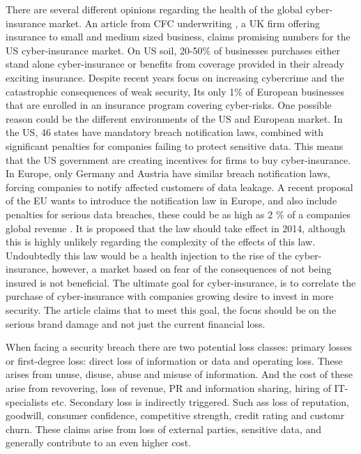 There are several different opinions regarding the health of the global cyber-insurance market. 
An article from CFC underwriting \cite{CFCunder}, a UK firm offering insurance to small 
and medium sized business, claims promising numbers for the US cyber-insurance market. 
On US soil, 20-50$\%$ of businesses purchases either stand alone cyber-insurance or benefits from
 coverage provided in their already exciting insurance. Despite recent years focus on increasing
  cybercrime and the catastrophic consequences of weak security, 
  Its only 1$\%$ of European businesses that are enrolled in an insurance program covering cyber-risks. 
One possible reason could be the different environments of the US and European market. 
In the US, 46 states have mandatory breach notification laws, combined with significant penalties 
for companies failing to protect sensitive data. This means that the US government are creating incentives for firms to buy cyber-insurance.
 In Europe, only Germany and Austria have similar breach notification laws,
 forcing companies to notify affected customers of data leakage. A recent proposal of the EU wants to introduce the notification law in Europe, and also include penalties for serious data breaches, these could be as high as 2 $\%$ of a companies global revenue \cite{CFCunder}. It is proposed that the law should take effect in 2014, although this is highly unlikely regarding the complexity of the effects of this law. Undoubtedly this law would be a health injection to the rise of the cyber-insurance, however, a market based on fear of the consequences of not being insured is not beneficial. The ultimate goal for cyber-insurance, is to correlate the purchase of cyber-insurance with companies growing desire to invest in more security. 
The article claims that to meet this goal, the focus should be on the serious brand damage and not just the current financial loss. \cite{CFCunder}



When facing a security breach there are two potential loss classes:
primary losses or first-degree loss: direct loss of information or data and operating loss. 
These arises from unuse, disuse, abuse and misuse of information.
 And the cost of these arise from revovering, loss of revenue, 
 PR and information sharing, hiring of IT-specialists etc. 
Secondary loss is indirectly triggered. Such ass loss of reputation, goodwill, 
consumer confidence, competitive strength, credit rating and customr churn. 
These claims arise from loss of external parties, sensitive data, 
and generally contribute to an even higher cost. \cite{bandyopadhyay2009managers} 

